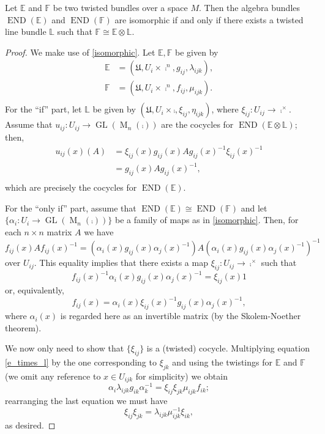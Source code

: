 \begin{proposition}\label{tensor_l}
Let $\mathbb{E}$ and $\mathbb{F}$ be two twisted bundles over a space $M$. Then the algebra bundles $\operatorname{END}(\mathbb{E})$ and $\operatorname{END}(\mathbb{F})$ are isomorphic if and only if there exists a twisted line bundle $\mathbb{L}$ such that $\mathbb{F}\cong \mathbb{E}\otimes \mathbb{L}$.
\end{proposition}
\begin{proof}
We make use of \ref{isomorphic}. Let $\mathbb{E}, \mathbb{F}$ be given by
$$
\begin{aligned}
\mathbb{E} &= (\mathfrak{U},U_i\times \comp^n,g_{ij},\lambda_{ijk}), \\
\mathbb{F} &= (\mathfrak{U},U_i\times \comp^n,f_{ij},\mu_{ijk}). \\
\end{aligned}
$$
For the ``if'' part, let $\mathbb{L}$ be given by $(\mathfrak{U},U_i\times \comp,\xi_{ij},\eta_{ijk})$, where $\xi_{ij}:U_{ij}\to \comp^\times$. Assume that $u_{ij}:U_{ij}\to \operatorname{GL}(\operatorname{M}_n(\comp ))$ are the cocycles for $\operatorname{END}(\mathbb{E}\otimes \mathbb{L})$; then,
$$
\begin{aligned}
u_{ij}(x)(A) &= \xi_{ij}(x)g_{ij}(x)Ag_{ij}(x)^{-1}\xi_{ij}(x)^{-1} \\
             &= g_{ij}(x)Ag_{ij}(x)^{-1}, \\
\end{aligned}
$$
which are precisely the cocycles for $\operatorname{END}(\mathbb{E})$.

For the ``only if'' part, assume that $\operatorname{END}(\mathbb{E})\cong \operatorname{END}(\mathbb{F})$ and let $\{\alpha_i:U_i\to \operatorname{GL}(\operatorname{M}_n(\comp ))\}$ be a family of maps as in \ref{isomorphic}. Then, for each $n\times n$ matrix $A$ we have
$$f_{ij}(x)Af_{ij}(x)^{-1}=(\alpha_i(x)g_{ij}(x)\alpha_j(x)^{-1})A(\alpha_i(x)g_{ij}(x)\alpha_j(x)^{-1})^{-1}$$
over $U_{ij}$. This equality implies that there exists a map $\xi_{ij}:U_{ij}\to \comp^\times$ such that
\begin{equation}\label{e_times_l}
f_{ij}(x)^{-1}\alpha_i(x)g_{ij}(x)\alpha_j(x)^{-1}=\xi_{ij}(x)1
\end{equation}
or, equivalently,
$$f_{ij}(x)=\alpha_i(x)\xi_{ij}(x)^{-1}g_{ij}(x)\alpha_j(x)^{-1},$$
where $\alpha_i(x)$ is regarded here as an invertible matrix (by the Skolem-Noether theorem).

We now only need to show that $\{\xi_{ij}\}$ is a (twisted) cocycle. Multiplying equation \eqref{e_times_l} by the one corresponding to $\xi_{jk}$ and using the twistings for $\mathbb{E}$ and $\mathbb{F}$ (we omit any reference to $x\in U_{ijk}$ for simplicity) we obtain
$$\alpha_i \lambda_{ijk}g_{ik}\alpha_k^{-1}=\xi_{ij}\xi_{jk}\mu_{ijk}f_{ik};$$
rearranging the last equation we must have
$$\xi_{ij}\xi_{jk}=\lambda_{ijk}\mu_{ijk}^{-1}\xi_{ik},$$
as desired.
\end{proof}

